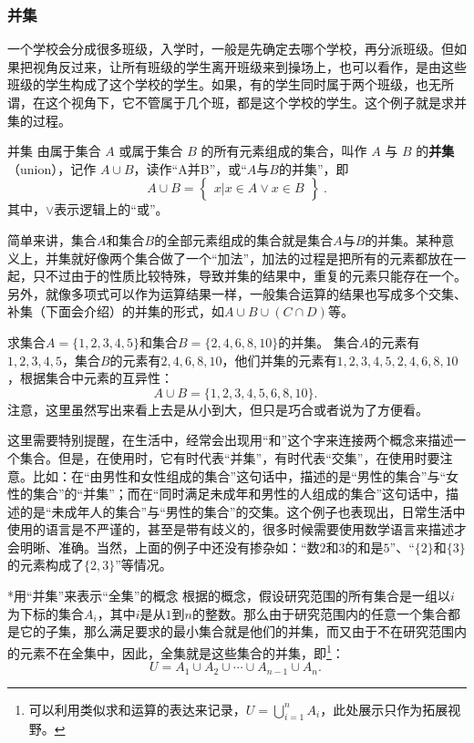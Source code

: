 \subsubsection{并集}

一个学校会分成很多班级，入学时，一般是先确定去哪个学校，再分派班级。但如果把视角反过来，让所有班级的学生离开班级来到操场上，也可以看作，是由这些班级的学生构成了这个学校的学生。如果，有的学生同时属于两个班级，也无所谓，在这个视角下，它不管属于几个班，都是这个学校的学生。这个例子就是求并集的过程。

\begin{definition}{并集}
由属于集合 $A$ 或属于集合 $B$ 的所有元素组成的集合，叫作 $A$ 与 $B$ 的\textbf{并集}（union），记作 $A\cup B$，读作“A并B”，或“$A$与$B$的并集”，即
\begin{equation}
A\cup B = \begin{Bmatrix}x|x\in A \lor x\in B\end{Bmatrix}~.
\end{equation}
其中，$\lor$表示逻辑上的“或”。
\end{definition}
简单来讲，集合$A$和集合$B$的全部元素组成的集合就是集合$A$与$B$的并集。某种意义上，并集就好像两个集合做了一个“加法”，加法的过程是把所有的元素都放在一起，只不过由于的性质比较特殊，导致并集的结果中，重复的元素只能存在一个。另外，就像多项式可以作为运算结果一样，一般集合运算的结果也写成多个交集、补集（下面会介绍）的并集的形式，如$A\cup B\cup (C\cap D)$等。

\begin{example}{求集合$A=\{1,2,3,4,5\}$和集合$B=\{2,4,6,8,10\}$的并集。}\label{ex_HsSeOp_1}
集合$A$的元素有$1,2,3,4,5$，集合$B$的元素有$2,4,6,8,10$，他们并集的元素有$1,2,3,4,5,2,4,6,8,10$，根据集合中元素的互异性：
$$
A\cup B=\{1,2,3,4,5,6,8,10\}.~
$$
注意，这里虽然写出来看上去是从小到大，但只是巧合或者说为了方便看。
\end{example}

这里需要特别提醒，在生活中，经常会出现用“和”这个字来连接两个概念来描述一个集合。但是，在使用时，它有时代表“并集”，有时代表“交集”，在使用时要注意。比如：在“由男性和女性组成的集合”这句话中，描述的是“男性的集合”与“女性的集合”的“并集”；而在“同时满足未成年和男性的人组成的集合”这句话中，描述的是“未成年人的集合”与“男性的集合”的交集。这个例子也表现出，日常生活中使用的语言是不严谨的，甚至是带有歧义的，很多时候需要使用数学语言来描述才会明晰、准确。当然，上面的例子中还没有掺杂如：“数$2$和$3$的和是$5$”、“$\{2\}$和$\{3\}$的元素构成了$\{2,3\}$”等情况。

\begin{example}{*用“并集”来表示“全集”的概念}
根据的概念，假设研究范围的所有集合是一组以$i$为下标的集合$A_i$，其中$i$是从$1$到$n$的整数。那么由于研究范围内的任意一个集合都是它的子集，那么满足要求的最小集合就是他们的并集，而又由于不在研究范围内的元素不在全集中，因此，全集就是这些集合的并集，即\footnote{可以利用类似求和运算的表达来记录，$\displaystyle U=\bigcup_{i=1}^n A_i$，此处展示只作为拓展视野。}：
$$
U=A_1\cup A_2\cup \cdots \cup A_{n-1}\cup A_n.~
$$
\end{example}


